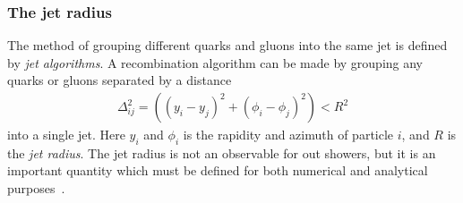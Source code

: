 \documentclass[main.tex]{subfiles}
\begin{document}
\subsubsection*{The jet radius}
The method of grouping different quarks and gluons into the same jet is defined by \textit{jet algorithms}. A recombination algorithm can be made by grouping any quarks or gluons separated by a distance 
\begin{align}
    \Delta_{ij}^2 = ((y_i-y_j)^2+(\phi_i-\phi_j)^2) < R^2
\end{align} 
into a single jet. Here \(y_i\) and \(\phi_i\) is the rapidity and azimuth of particle \(i\), and \(R\) is the \textit{jet radius}. The jet radius is not an observable for out showers, but it is an important quantity which must be defined for both numerical and analytical purposes~\cite{Dasgupta_2015}.
\end{document}
